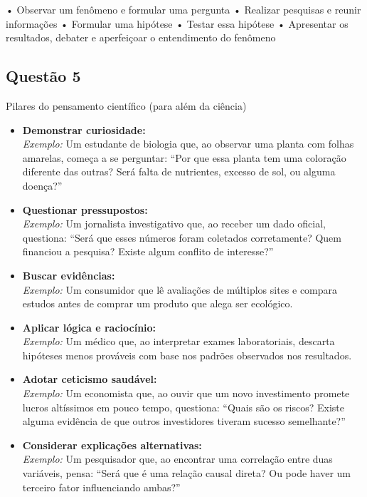 \documentclass[
]{book}
\begin{document}
• Observar um fenômeno e formular uma pergunta
• Realizar pesquisas e reunir informações
• Formular uma hipótese
• Testar essa hipótese
• Apresentar os resultados, debater e aperfeiçoar o entendimento do fenômeno

\subsection{Questão 5}\label{questuxe3o-5}

Pilares do pensamento científico (para além da ciência)

\begin{itemize}
\item[$\square$]
  \textbf{Demonstrar curiosidade:}\\
  \emph{Exemplo:} Um estudante de biologia que, ao observar uma planta com folhas amarelas, começa a se perguntar: ``Por que essa planta tem uma coloração diferente das outras? Será falta de nutrientes, excesso de sol, ou alguma doença?''
\item[$\square$]
  \textbf{Questionar pressupostos:}\\
  \emph{Exemplo:} Um jornalista investigativo que, ao receber um dado oficial, questiona: ``Será que esses números foram coletados corretamente? Quem financiou a pesquisa? Existe algum conflito de interesse?''
\item[$\square$]
  \textbf{Buscar evidências:}\\
  \emph{Exemplo:} Um consumidor que lê avaliações de múltiplos sites e compara estudos antes de comprar um produto que alega ser ecológico.
\item[$\square$]
  \textbf{Aplicar lógica e raciocínio:}\\
  \emph{Exemplo:} Um médico que, ao interpretar exames laboratoriais, descarta hipóteses menos prováveis com base nos padrões observados nos resultados.
\item[$\square$]
  \textbf{Adotar ceticismo saudável:}\\
  \emph{Exemplo:} Um economista que, ao ouvir que um novo investimento promete lucros altíssimos em pouco tempo, questiona: ``Quais são os riscos? Existe alguma evidência de que outros investidores tiveram sucesso semelhante?''
\item[$\square$]
  \textbf{Considerar explicações alternativas:}\\
  \emph{Exemplo:} Um pesquisador que, ao encontrar uma correlação entre duas variáveis, pensa: ``Será que é uma relação causal direta? Ou pode haver um terceiro fator influenciando ambas?''

\end{itemize}
\end{document}

